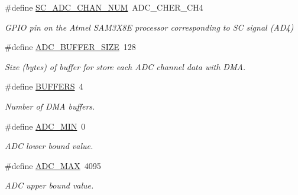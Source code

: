 \begin{DoxyCompactItemize}
\mbox{\label{group___board__model__group_ga564adb575db2620ac85e3abdd6a5bbaf}} 
\#define \mbox{\hyperlink{group___board__model__group_ga564adb575db2620ac85e3abdd6a5bbaf}{S\+C\+\_\+\+A\+D\+C\+\_\+\+C\+H\+A\+N\+\_\+\+N\+UM}}~A\+D\+C\+\_\+\+C\+H\+E\+R\+\_\+\+C\+H4
\begin{DoxyCompactList}\small\item\em G\+P\+IO pin on the Atmel S\+A\+M3\+X8E processor corresponding to SC signal (A\+D4) \end{DoxyCompactList}\item 
\mbox{\label{group___board__model__group_ga602abb8ec84dcb3b6f854a738310ea46}} 
\#define \mbox{\hyperlink{group___board__model__group_ga602abb8ec84dcb3b6f854a738310ea46}{A\+D\+C\+\_\+\+B\+U\+F\+F\+E\+R\+\_\+\+S\+I\+ZE}}~128
\begin{DoxyCompactList}\small\item\em Size (bytes) of buffer for store each A\+DC channel data with D\+MA. \end{DoxyCompactList}\item 
\#define \mbox{\hyperlink{group___board__model__group_gaabe0f927d44a09f458bd5fe5ab4e2f7f}{B\+U\+F\+F\+E\+RS}}~4
\begin{DoxyCompactList}\small\item\em Number of D\+MA buffers. \end{DoxyCompactList}\item 
\mbox{\label{group___board__model__group_gaf0098a1eafb8a60a1c65773e1064d595}} 
\#define \mbox{\hyperlink{group___board__model__group_gaf0098a1eafb8a60a1c65773e1064d595}{A\+D\+C\+\_\+\+M\+IN}}~0
\begin{DoxyCompactList}\small\item\em A\+DC lower bound value. \end{DoxyCompactList}\item 
\mbox{\label{group___board__model__group_ga555a695bf58df062dc03f0e892d95cd7}} 
\#define \mbox{\hyperlink{group___board__model__group_ga555a695bf58df062dc03f0e892d95cd7}{A\+D\+C\+\_\+\+M\+AX}}~4095
\begin{DoxyCompactList}\small\item\em A\+DC upper bound value. \end{DoxyCompactList}\item 

\end{DoxyCompactItemize}
